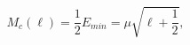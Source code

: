 \begin{equation}                              
M_{c}(\ell) = \frac{1}{2} E_{min} = \mu \sqrt{\ell + \frac{1}{2}} ,                              
\label{eq:mc}                              
\end{equation} 
